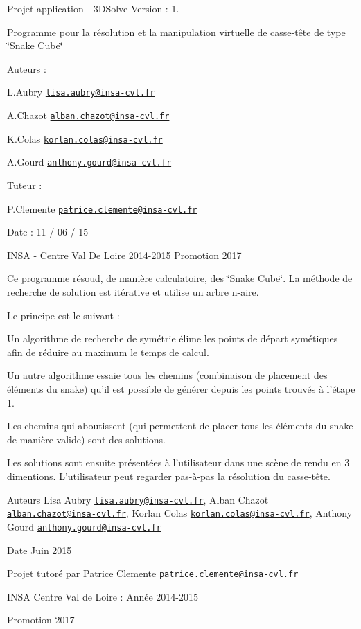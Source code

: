 Projet application -\/ 3\-D\-Solve Version \-: 1.

Programme pour la résolution et la manipulation virtuelle de casse-\/tête de type \char`\"{}\-Snake Cube\char`\"{}

Auteurs \-:
\begin{DoxyItemize}
\item L.\-Aubry \href{mailto:lisa.aubry@insa-cvl.fr}{\tt lisa.\-aubry@insa-\/cvl.\-fr}
\item A.\-Chazot \href{mailto:alban.chazot@insa-cvl.fr}{\tt alban.\-chazot@insa-\/cvl.\-fr}
\item K.\-Colas \href{mailto:korlan.colas@insa-cvl.fr}{\tt korlan.\-colas@insa-\/cvl.\-fr}
\item A.\-Gourd \href{mailto:anthony.gourd@insa-cvl.fr}{\tt anthony.\-gourd@insa-\/cvl.\-fr}
\end{DoxyItemize}

Tuteur \-:
\begin{DoxyItemize}
\item P.\-Clemente \href{mailto:patrice.clemente@insa-cvl.fr}{\tt patrice.\-clemente@insa-\/cvl.\-fr}
\end{DoxyItemize}

Date \-: 11 / 06 / 15

I\-N\-S\-A -\/ Centre Val De Loire 2014-\/2015 Promotion 2017

Ce programme résoud, de manière calculatoire, des \char`\"{}\-Snake Cube\char`\"{}. La méthode de recherche de solution est itérative et utilise un arbre n-\/aire.

Le principe est le suivant \-:
\begin{DoxyEnumerate}
\item Un algorithme de recherche de symétrie élime les points de départ symétiques afin de réduire au maximum le temps de calcul.
\item Un autre algorithme essaie tous les chemins (combinaison de placement des éléments du snake) qu'il est possible de générer depuis les points trouvés à l'étape 1.
\item Les chemins qui aboutissent (qui permettent de placer tous les éléments du snake de manière valide) sont des solutions.
\item Les solutions sont ensuite présentées à l'utilisateur dans une scène de rendu en 3 dimentions. L'utilisateur peut regarder pas-\/à-\/pas la résolution du casse-\/tête.
\end{DoxyEnumerate}

\begin{DoxyAuthor}{Auteurs}
Lisa Aubry \href{mailto:lisa.aubry@insa-cvl.fr}{\tt lisa.\-aubry@insa-\/cvl.\-fr}, Alban Chazot \href{mailto:alban.chazot@insa-cvl.fr}{\tt alban.\-chazot@insa-\/cvl.\-fr}, Korlan Colas \href{mailto:korlan.colas@insa-cvl.fr}{\tt korlan.\-colas@insa-\/cvl.\-fr}, Anthony Gourd \href{mailto:anthony.gourd@insa-cvl.fr}{\tt anthony.\-gourd@insa-\/cvl.\-fr} 
\end{DoxyAuthor}
\begin{DoxyDate}{Date}
Juin 2015
\end{DoxyDate}
Projet tutoré par Patrice Clemente \href{mailto:patrice.clemente@insa-cvl.fr}{\tt patrice.\-clemente@insa-\/cvl.\-fr}

I\-N\-S\-A Centre Val de Loire \-: Année 2014-\/2015

Promotion 2017 